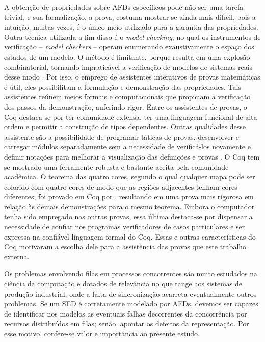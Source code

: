 A obtenção de propriedades sobre AFDs específicos pode não ser uma tarefa trivial, e sua formalização, a prova, costuma mostrar-se ainda mais difícil, pois a intuição, muitas vezes, é o único meio utilizado para a garantia das propriedades. Outra técnica utilizada a fim disso é o \textit{model checking}, no qual os instrumentos de verificação -- \textit{model checkers} -- operam enumerando exaustivamente o espaço dos estados de um modelo. O método é limitante, porque resulta em uma explosão combinatorial, tornando impraticável a verificação de modelos de sistemas reais desse modo \cite{athalye}. Por isso, o emprego de assistentes interativos de provas matemáticas é útil, eles possibilitam a formulação e demonstração das propriedades. Tais assistentes reúnem meios formais e computacionais que propiciam a verificação dos passos da demonstração, auferindo rigor. Entre os assistentes de provas, o Coq destaca-se por ter comunidade extensa, ter uma linguagem funcional de alta ordem e permitir a construção de tipos dependentes. Outras qualidades desse assistente são a possibilidade de programar táticas de provas, desenvolver e carregar módulos separadamente sem a necessidade de verificá-los novamente e definir notações para melhorar a visualização das definições e provas \cite{manualcoq}. O Coq tem se mostrado uma ferramente robusta e bastante aceita pela comunidade acadêmica. O teorema das quatro cores, segundo o qual qualquer mapa pode ser colorido com quatro cores de modo que as regiões adjacentes tenham cores diferentes, foi provado em Coq por , resultando em uma prova mais rigorosa em relação às demais demonstrações para o mesmo teorema. Embora o computador tenha sido empregado nas outras provas, essa última destaca-se por dispensar a necessidade de confiar nos programas verificadores de casos particulares e ser expressa na confiável linguagem formal do Coq. Essas e outras características do Coq motivaram a escolha dele para a assistência das provas que este trabalho externa.

Os problemas envolvendo filas em processos concorrentes são muito estudados na ciência da computação e dotados de relevância no que tange aos sistemas de produção industrial, onde a falta de sincronização acarreta eventualmente outros problemas. Se um SED é corretamente modelado por AFDs, devemos ser capazes de identificar nos modelos as eventuais falhas decorrentes da concorrência por recursos distribuídos em filas; senão, apontar os defeitos da representação. Por esse motivo, confere-se valor e importância ao presente estudo.


